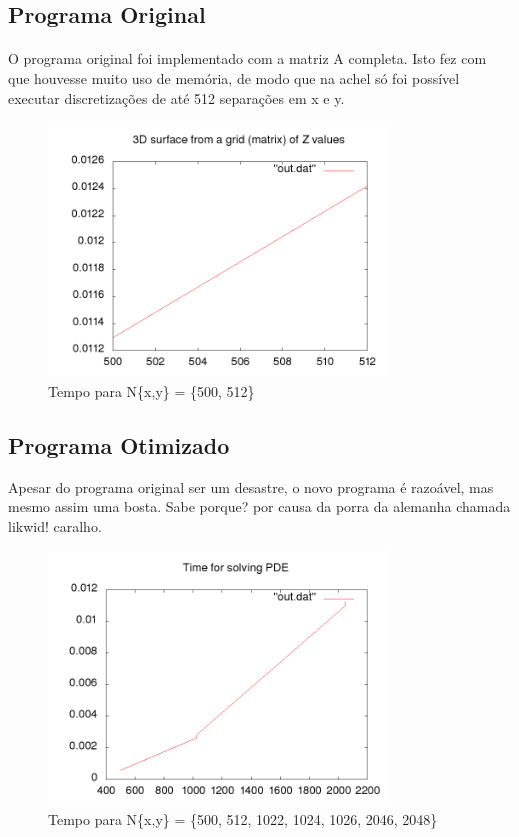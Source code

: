 \documentclass[12pt]{article}
\begin{document}
	\subsection{Programa Original}
	\paragraph{} O programa original foi implementado com a matriz A completa. Isto fez com que houvesse muito uso de memória, de modo que na achel só foi possível executar discretizações de até 512 separações em x e y.
	\begin{figure}[ht!]
		\centering
		\includegraphics[width=90mm]{oldtime.png}
		\caption{Tempo para N\{x,y\} = \{500, 512\}
		\label{overflow}}
	\end{figure}
	
	\newpage

	\subsection{Programa Otimizado}
	
	Apesar do programa original ser um desastre, o novo programa é razoável, mas mesmo assim uma bosta. Sabe porque? por causa da porra da alemanha chamada likwid! caralho.
	\begin{figure}[ht!]
		\centering
		\includegraphics[width=90mm]{newtime.png}
		\caption{Tempo para N\{x,y\} = \{500, 512, 1022, 1024, 1026, 2046, 2048\} 			\label{overflow}}
	\end{figure}
\newpage
\end{document}
